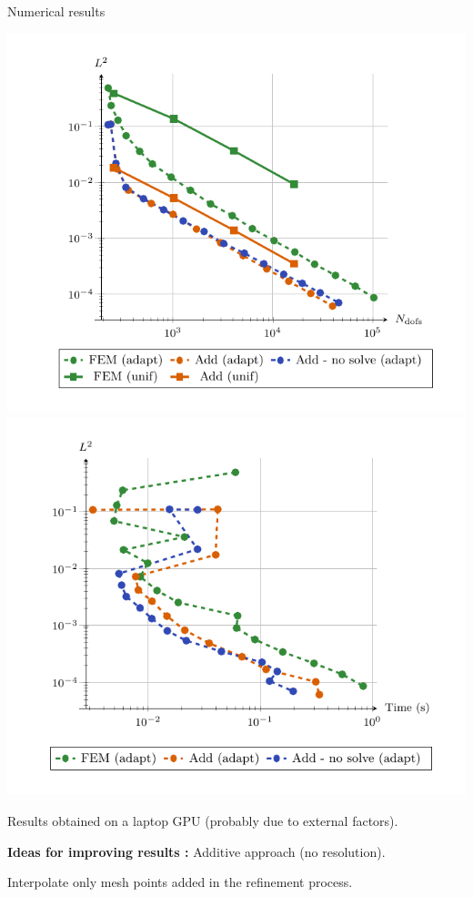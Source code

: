 \begin{frame}{Numerical results}
    \vspace{-10pt}
    \begin{center}
        \includegraphics[width=0.4\linewidth]{images/newlines/mesh/results/cvg.pdf}
        \includegraphics[width=0.4\linewidth]{images/newlines/mesh/results/times.pdf}
    \end{center}
    
    \vspace{-10pt}
    \footnotesize
    \warning \quad Results obtained on a laptop GPU (probably due to external factors).
    
    \normalsize
    \vspace{5pt}
    \textbf{Ideas for improving results :} Additive approach (no resolution).

    \vspace{3pt}
    \begin{minipage}{0.1\linewidth}
    \end{minipage} \hspace{5pt}
    \begin{minipage}{0.86\linewidth}
        \vspace{2pt}
        Interpolate only mesh points added in the refinement process. \\


\end{minipage}
\end{frame}
